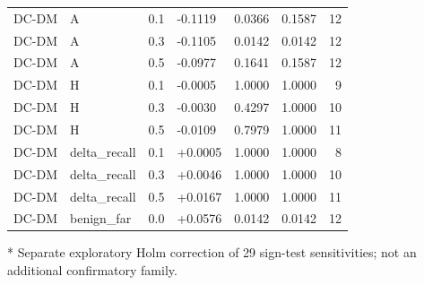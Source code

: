 \documentclass[10pt,a4paper]{article}
\begin{document}
\begin{longtable}{llllrrr}
DC-DM & A & 0.1 & -0.1119 & 0.0366 & 0.1587 & 12\\
DC-DM & A & 0.3 & -0.1105 & 0.0142 & 0.0142 & 12\\
DC-DM & A & 0.5 & -0.0977 & 0.1641 & 0.1587 & 12\\
DC-DM & H & 0.1 & -0.0005 & 1.0000 & 1.0000 & 9\\
DC-DM & H & 0.3 & -0.0030 & 0.4297 & 1.0000 & 10\\
DC-DM & H & 0.5 & -0.0109 & 0.7979 & 1.0000 & 11\\
DC-DM & delta\_recall & 0.1 & +0.0005 & 1.0000 & 1.0000 & 8\\
DC-DM & delta\_recall & 0.3 & +0.0046 & 1.0000 & 1.0000 & 10\\
DC-DM & delta\_recall & 0.5 & +0.0167 & 1.0000 & 1.0000 & 11\\
DC-DM & benign\_far & 0.0 & +0.0576 & 0.0142 & 0.0142 & 12\\
\bottomrule\end{longtable}
* Separate exploratory Holm correction of 29 sign-test sensitivities; not an additional confirmatory family.
\end{document}
